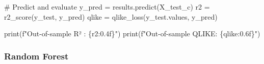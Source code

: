 \documentclass[
  letterpaper,
  DIV=11,
  numbers=noendperiod]{scrartcl}
\newenvironment{Shaded}{\begin{snugshade}}{\end{snugshade}}
\newcommand{\BuiltInTok}[1]{\textcolor[rgb]{0.00,0.23,0.31}{#1}}
\newcommand{\CommentTok}[1]{\textcolor[rgb]{0.37,0.37,0.37}{#1}}
\newcommand{\NormalTok}[1]{\textcolor[rgb]{0.00,0.23,0.31}{#1}}
\newcommand{\OperatorTok}[1]{\textcolor[rgb]{0.37,0.37,0.37}{#1}}
\newcommand{\SpecialCharTok}[1]{\textcolor[rgb]{0.37,0.37,0.37}{#1}}
\newcommand{\SpecialStringTok}[1]{\textcolor[rgb]{0.13,0.47,0.30}{#1}}
\begin{document}
\begin{Shaded}
\begin{Highlighting}[]
\CommentTok{\# Predict and evaluate}
\NormalTok{y\_pred }\OperatorTok{=}\NormalTok{ results.predict(X\_test\_c)}
\NormalTok{r2     }\OperatorTok{=}\NormalTok{ r2\_score(y\_test, y\_pred)}
\NormalTok{qlike  }\OperatorTok{=}\NormalTok{ qlike\_loss(y\_test.values, y\_pred)}

\BuiltInTok{print}\NormalTok{(}\SpecialStringTok{f"Out{-}of{-}sample R²   : }\SpecialCharTok{\{}\NormalTok{r2}\SpecialCharTok{:0.4f\}}\SpecialStringTok{"}\NormalTok{)}
\BuiltInTok{print}\NormalTok{(}\SpecialStringTok{f"Out{-}of{-}sample QLIKE: }\SpecialCharTok{\{}\NormalTok{qlike}\SpecialCharTok{:0.6f\}}\SpecialStringTok{"}\NormalTok{)}
\end{Highlighting}
\end{Shaded}

\subsubsection{Random Forest}\label{random-forest}
\end{document}
